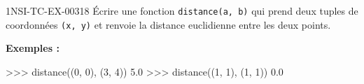 \begin{exercice}{1NSI-TC-EX-003}{1}{8}
Écrire une fonction \lstinline{distance(a, b)} qui prend deux tuples de coordonnées
\lstinline{(x, y)} et renvoie la distance euclidienne entre les deux points.

\textbf{Exemples :}
\begin{console}
>>> distance((0, 0), (3, 4))
5.0
>>> distance((1, 1), (1, 1))
0.0
\end{console}
\end{exercice}
